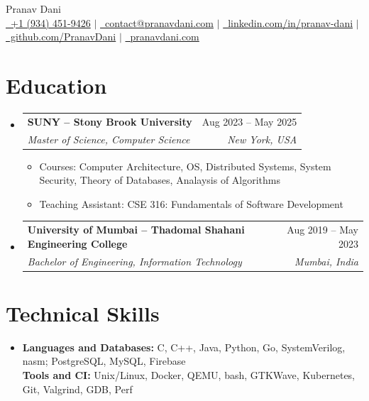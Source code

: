 \documentclass[letterpaper,11pt]{article}
\makeatletter
\newcommand{\resumeItem}[1]{
  \item\small{
    {#1 \vspace{-2pt}}
  }
}
\newcommand{\resumeSubheading}[4]{
  \vspace{-2pt}\item
    \begin{tabular*}{1.0\textwidth}[t]{l@{\extracolsep{\fill}}r}
      \vspace{-2pt}\textbf{#1} & \small #2 \\
      \textit{\small#3} & \textit{\small #4} \\
    \end{tabular*}\vspace{-7pt}
}
\newcommand{\resumeSubHeadingListStart}{\begin{itemize}[leftmargin=0.0in, label={}]}
\newcommand{\resumeSubHeadingListEnd}{\end{itemize}}
\newcommand{\resumeItemListStart}{\begin{itemize}}
\newcommand{\resumeItemListEnd}{\end{itemize}\vspace{-5pt}}
\makeatother
\begin{document}
\begin{center}
  {\huge Pranav Dani} \\ \vspace{4pt}
  \small
  \href{tel:+19344529426}{\raisebox{-0.2\height}\ +1 (934) 451-9426} $|$
  \href{mailto:contact@pranavdani.com}{\raisebox{-0.2\height}\    contact@pranavdani.com} $|$
  \href{https://linkedin.com/in/pranav-dani}{\raisebox{-0.2\height}\  linkedin.com/in/pranav-dani} $|$
  \href{https://github.com/PranavDani}{\raisebox{-0.2\height}\  github.com/PranavDani} $|$
  \href{https://pranavdani.com}{\raisebox{-0.1\height}\ pranavdani.com}
  \vspace{-8pt}
\end{center}


\section{Education}
\resumeSubHeadingListStart
\resumeSubheading
{SUNY -- Stony Brook University}{Aug 2023 -- May 2025}
{Master of Science, Computer Science}{New York, USA}
\resumeItemListStart
\resumeItem{Courses: Computer Architecture, OS, Distributed Systems, System Security, Theory of Databases, Analaysis of Algorithms}
\resumeItem{Teaching Assistant: CSE 316: Fundamentals of Software Development}
\resumeItemListEnd
\vspace{-3pt}

\resumeSubheading
{University of Mumbai -- Thadomal Shahani Engineering College}{Aug 2019 -- May 2023}
{Bachelor of Engineering, Information Technology}{Mumbai, India}
\resumeSubHeadingListEnd


\section{Technical Skills}
\begin{itemize}[leftmargin=0.2in, label={}]
  \item \textbf{Languages and Databases:} C, C++, Java, Python, Go, SystemVerilog, nasm; PostgreSQL, MySQL, Firebase\\
        \textbf{Tools and CI:} Unix/Linux, Docker, QEMU, bash, GTKWave, Kubernetes, Git, Valgrind, GDB, Perf
\end{itemize}
\vspace{-16pt}


\end{document}
